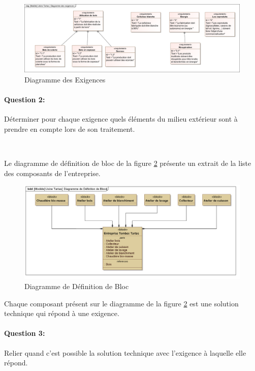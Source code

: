 \begin{figure}[!h]
\begin{center}
\includegraphics[width=\linewidth]{img/Tartas_exigences}
\caption{Diagramme des Exigences}
\label{fig:tartas_ex}
\end{center}
\end{figure}

\paragraph{Question 2:} Déterminer pour chaque exigence quels éléments du milieu extérieur sont à prendre en compte lors de son traitement.

~\

Le diagramme de définition de bloc de la figure \ref{fig:tartas_bl} présente un extrait de la liste des composants de l'entreprise.

\begin{figure}[!h]
\begin{center}
\includegraphics[width=\linewidth]{img/Tartas_bloc}
\caption{Diagramme de Définition de Bloc}
\label{fig:tartas_bl}
\end{center}
\end{figure}

Chaque composant présent sur le diagramme de la figure \ref{fig:tartas_bl} est une solution technique qui répond à une exigence.

\paragraph{Question 3:} Relier quand c'est possible la solution technique avec l'exigence à laquelle elle répond.

